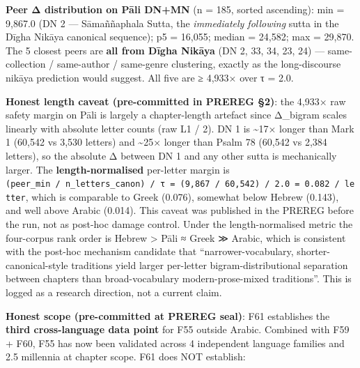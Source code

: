 \documentclass[
]{article}
\begin{document}
\textbf{Peer Δ distribution on Pāli DN+MN} (n = 185, sorted ascending):
min = 9,867.0 (DN 2 --- Sāmaññaphala Sutta, the \emph{immediately
following} sutta in the Dīgha Nikāya canonical sequence); p5 = 16,055;
median = 24,582; max = 29,870. The 5 closest peers are \textbf{all from
Dīgha Nikāya} (DN 2, 33, 34, 23, 24) --- same-collection / same-author /
same-genre clustering, exactly as the long-discourse nikāya prediction
would suggest. All five are ≥ 4,933× over τ = 2.0.

\textbf{Honest length caveat (pre-committed in PREREG §2)}: the 4,933×
raw safety margin on Pāli is largely a chapter-length artefact since
Δ\_bigram scales linearly with absolute letter counts (raw L1 / 2). DN 1
is \textasciitilde17× longer than Mark 1 (60,542 vs 3,530 letters) and
\textasciitilde25× longer than Psalm 78 (60,542 vs 2,384 letters), so
the absolute Δ between DN 1 and any other sutta is mechanically larger.
The \textbf{length-normalised} per-letter margin is
\texttt{(peer\_min\ /\ n\_letters\_canon)\ /\ τ\ =\ (9,867\ /\ 60,542)\ /\ 2.0\ =\ 0.082\ /\ letter},
which is comparable to Greek (0.076), somewhat below Hebrew (0.143), and
well above Arabic (0.014). This caveat was published in the PREREG
before the run, not as post-hoc damage control. Under the
length-normalised metric the four-corpus rank order is Hebrew
\textgreater{} Pāli ≈ Greek ≫ Arabic, which is consistent with the
post-hoc mechanism candidate that ``narrower-vocabulary,
shorter-canonical-style traditions yield larger per-letter
bigram-distributional separation between chapters than broad-vocabulary
modern-prose-mixed traditions''. This is logged as a research direction,
not a current claim.

\textbf{Honest scope (pre-committed at PREREG seal)}: F61 establishes
the \textbf{third cross-language data point} for F55 outside Arabic.
Combined with F59 + F60, F55 has now been validated across 4 independent
language families and 2.5 millennia at chapter scope. F61 does NOT
establish:
\end{document}
